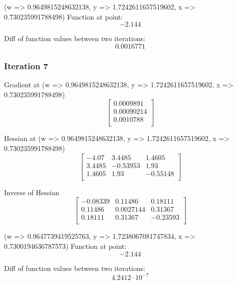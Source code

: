 \documentclass{article}
\begin{document}
(w => 0.9649815248632138, y => 1.7242611657519602, x => 0.730235991788498)
Function at point:
\begin{equation}
-2.144
\end{equation}

Diff of function values between two iterations:
\begin{equation}
0.0016771
\end{equation}

\subsubsection{Iteration 7}
Gradient at (w => 0.9649815248632138, y => 1.7242611657519602, x => 0.730235991788498)
\begin{equation}
\left[
\begin{array}{c}
0.0009891 \\
0.00090214 \\
0.0010788 \\
\end{array}
\right]
\end{equation}

Hessian at (w => 0.9649815248632138, y => 1.7242611657519602, x => 0.730235991788498)
\begin{equation}
\left[
\begin{array}{ccc}
-4.07 & 3.4485 & 1.4605 \\
3.4485 & -0.53953 & 1.93 \\
1.4605 & 1.93 & -0.55148 \\
\end{array}
\right]
\end{equation}

Inverse of Hessian
\begin{equation}
\left[
\begin{array}{ccc}
-0.08339 & 0.11486 & 0.18111 \\
0.11486 & 0.0027144 & 0.31367 \\
0.18111 & 0.31367 & -0.23593 \\
\end{array}
\right]
\end{equation}

(w => 0.9647739419525763, y => 1.7238067081747834, x => 0.7300194636787573)
Function at point:
\begin{equation}
-2.144
\end{equation}

Diff of function values between two iterations:
\begin{equation}
4.2412 \cdot 10^{-7}
\end{equation}
\end{document}
